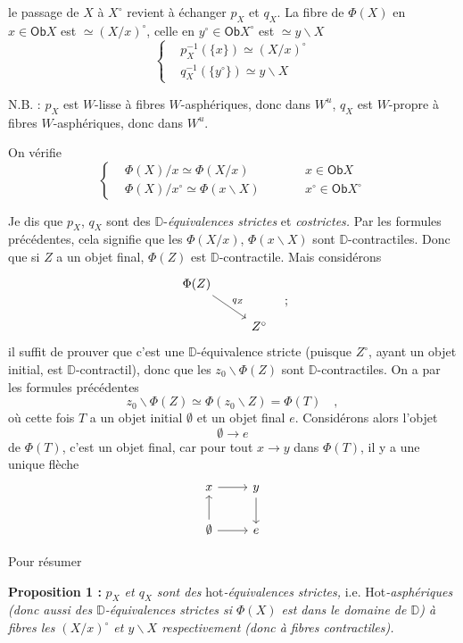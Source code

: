 \documentclass[11pt,leqno]{article}
\newcommand{\printedpage}[1]{\marginpar{\footnotesize p.~#1}}
\newcommand{\msp}[1]{\marginpar{\footnotesize [#1]}}
\newcommand{\Ob}{\mathsf{Ob}}
\newcommand{\D}{\mathbb{D}}
\newcommand{\bs}{\backslash}
\begin{document}
\printedpage{44}
le passage de $X$ à $X^\circ$ revient à échanger $p_X$ et $q_X$. La fibre de $\Phi(X)$ en $x \in \Ob X$ est $\simeq (X/x)^\circ$, celle en $y^\circ \in \Ob X^\circ$ est $\simeq y\bs X$
\[
\left\{
\begin{aligned}
&p_X^{-1}(\{x\}) \simeq (X/x)^\circ\\
&q_X^{-1}(\{y^\circ\}) \simeq y\bs X
\end{aligned}
\right.
\]

N.B. : $p_X$ est $W$-lisse à fibres $W$-asphériques, donc dans $W^u$, $q_X$ est $W$-propre à fibres $W$-asphériques, donc dans $W^u$.

\msp{page 74}

On vérifie
\[
\left\{
\begin{aligned}
&\Phi(X)/x \simeq \Phi(X/x) &\qquad& x \in \Ob X\\
&\Phi(X)/x^\circ \simeq \Phi(x\bs X) &\qquad& x^\circ \in \Ob X^\circ
\end{aligned}
\right.
\]

Je dis que $p_X$, $q_X$ sont des $\D$-\textit{équivalences strictes} et \textit{costrictes.} Par les formules précédentes, cela signifie que les $\Phi(X/x)$, $\Phi(x\bs X)$ sont $\D$-contractiles. Donc que si $Z$ a un objet final, $\Phi(Z)$ est $\D$-contractile. Mais considérons
\[
\begin{tikzcd}
\Phi(Z) \arrow[dr, "q_Z"] & \\
& Z^\circ
\end{tikzcd}
\quad ;
\]
il suffit de prouver que c'est une $\D$-équivalence stricte (puisque $Z^\circ$, ayant un objet initial, est $\D$-contractil), donc que les $z_0\bs\Phi(Z)$ sont $\D$-contractiles. On a par les formules précédentes %
\[
z_0\bs\Phi(Z) \simeq \Phi(z_0\bs Z) = \Phi(T) \quad ,
\]
où cette fois $T$ a un objet initial $\emptyset$ et un objet final $e$. Considérons alors l'objet
\[
\emptyset \longrightarrow e
\]
de $\Phi(T)$, c'est un objet final, car pour tout $x \to y$ dans $\Phi(T)$, il y a une unique flèche
\[
\begin{tikzcd}
x \arrow[r] & y \arrow[d] \\
\emptyset \arrow[u] \arrow[r] & e
\end{tikzcd}
\]

\printedpage{45}
\msp{page 75}

Pour résumer

\textbf{Proposition 1 :} \textit{$p_X$ et $q_X$ sont des} \textsf{hot}\textit{-équivalences strictes,} i.e. \textsf{Hot}\textit{-asphériques (donc aussi des $\D$-équivalences strictes si $\Phi(X)$ est dans le domaine de $\D$) à fibres les $(X/x)^\circ$ et $y\bs X$ respectivement (donc à fibres contractiles).}
\end{document}
